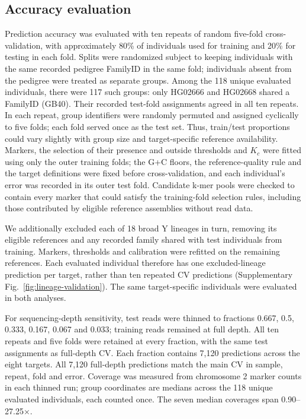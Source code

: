 \documentclass[pdflatex,sn-nature]{sn-jnl}
\begin{document}
\subsection{Accuracy evaluation}\label{sec:m-benchmark}
Prediction accuracy was evaluated with ten repeats of random five-fold cross-validation, with approximately 80\% of individuals used for training and 20\% for testing in each fold. Splits were randomized subject to keeping individuals with the same recorded pedigree FamilyID in the same fold; individuals absent from the pedigree were treated as separate groups. Among the 118 unique evaluated individuals, there were 117 such groups: only HG02666 and HG02668 shared a FamilyID (GB40). Their recorded test-fold assignments agreed in all ten repeats. In each repeat, group identifiers were randomly permuted and assigned cyclically to five folds; each fold served once as the test set. Thus, train/test proportions could vary slightly with group size and target-specific reference availability. Markers, the selection of their presence and outside thresholds and $K_c$ were fitted using only the outer training folds; the G+C floors, the reference-quality rule and the target definitions were fixed before cross-validation, and each individual's error was recorded in its outer test fold. Candidate k-mer pools were checked to contain every marker that could satisfy the training-fold selection rules, including those contributed by eligible reference assemblies without read data.

We additionally excluded each of 18 broad Y lineages in turn, removing its eligible references and any recorded family shared with test individuals from training. Markers, thresholds and calibration were refitted on the remaining references. Each evaluated individual therefore has one excluded-lineage prediction per target, rather than ten repeated CV predictions (Supplementary Fig.~\ref{fig:lineage-validation}). The same target-specific individuals were evaluated in both analyses.

For sequencing-depth sensitivity, test reads were thinned to fractions 0.667, 0.5, 0.333, 0.167, 0.067 and 0.033; training reads remained at full depth. All ten repeats and five folds were retained at every fraction, with the same test assignments as full-depth CV. Each fraction contains 7,120 predictions across the eight targets. All 7,120 full-depth predictions match the main CV in sample, repeat, fold and error. Coverage was measured from chromosome 2 marker counts in each thinned run; group coordinates are medians across the 118 unique evaluated individuals, each counted once. The seven median coverages span 0.90--27.25$\times$.
\end{document}
